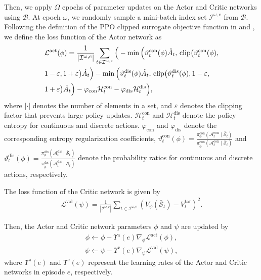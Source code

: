 \documentclass[10pt,journal,compsoc]{IEEEtran}
\begin{document}
Then, we apply $\Omega$ epochs of parameter updates on the Actor and Critic networks using $\mathcal{B}$.
At epoch $\omega$, we randomly sample a mini-batch index set $\mathcal{I}^{\omega,e}$ from $\mathcal{B}$.
Following the definition of the PPO clipped surrogate objective function in \cite{c5:IoTJ:HPPO} and \cite{c5:HPPO}, we define the loss function of the Actor network as
\begin{align}\label{c5:actor-network-update}
& \mathcal{L}^{\text{act}}(\phi)
= \frac{1}{|\mathcal{I}^{\omega,e}|}\sum_{t \in \mathcal{I}^{\omega,e}}
\Big(
-\min\Big(\vartheta_t^{\text{con}}(\phi)\hat{A}_t,\,
\text{clip}\big(\vartheta_t^{\text{con}}(\phi), \notag \\
& 1-\varepsilon, 1+\varepsilon\big)\hat{A}_t\Big) - \min\Big(\vartheta_t^{\text{dis}}(\phi)\hat{A}_t,\,
\text{clip}\big(\vartheta_t^{\text{dis}}(\phi), 1-\varepsilon, \notag \\
& 1+\varepsilon\big)\hat{A}_t\Big)
-\varphi_{\text{con}}\mathcal{H}_t^{\text{con}}
-\varphi_{\text{dis}}\mathcal{H}_t^{\text{dis}}
\Big),
\end{align}
where $\left|\cdot\right|$ denotes the number of elements in a set, and $\varepsilon$ denotes the clipping factor that prevents large policy updates. 
$\mathcal{H}_t^{\text{con}}$ and $\mathcal{H}_t^{\text{dis}}$ denote the policy entropy for continuous and discrete actions.
$\varphi_{\text{con}}$ and $\varphi_{\text{dis}}$ denote the corresponding entropy regularization coefficients,
$\vartheta_t^{\text{con}}(\phi) = \frac{\pi_{{\phi}}^{\text{con}}(\mathcal{A}_t^{\text{con}} \mid \bar{\mathcal{S}}_{t})} {\pi_{\tilde{\phi}}^{\text{con}}(\mathcal{A}_t^{\text{con}} \mid \bar{\mathcal{S}}_{t})}$ 
and $\vartheta_t^{\text{dis}}(\phi) = \frac{\pi_{{\phi}}^{\text{dis}}(\mathcal{A}_t^{\text{dis}} \mid \bar{\mathcal{S}}_{t})}{\pi_{\tilde{\phi}}^{\text{dis}}(\mathcal{A}_t^{\text{dis}} \mid \bar{\mathcal{S}}_{t})}$ denote the probability ratios for continuous and discrete actions, respectively.

The loss function of the Critic network is given by
\begin{align}\label{c5:critic-network-update}
\mathcal{L}^{\text{val}}(\psi) =
\frac{1}{|\mathcal{I}^{\omega,e}|}\sum_{t \in \mathcal{I}^{\omega,e}}
\left(
V_{\psi}(\bar{\mathcal{S}}_t)-V_t^{\text{tar}}
\right)^2.
\end{align}

Then, the Actor and Critic network parameters $\phi$ and $\psi$ are updated by
\begin{align}\label{c5:actor-para-update}
\phi \leftarrow \phi - \Upsilon^{\text{a}}(e)\nabla_{\phi}\mathcal{L}^{\text{act}}(\phi),
\end{align}
\begin{align}\label{c5:critic-para-update}
\psi \leftarrow \psi - \Upsilon^{\text{c}}(e)\nabla_{\psi}\mathcal{L}^{\text{val}}(\psi),
\end{align}
where $\Upsilon^{\text{a}}(e)$ and $\Upsilon^{\text{c}}(e)$ represent the learning rates of the Actor and Critic networks in episode $e$, respectively.
\end{document}
